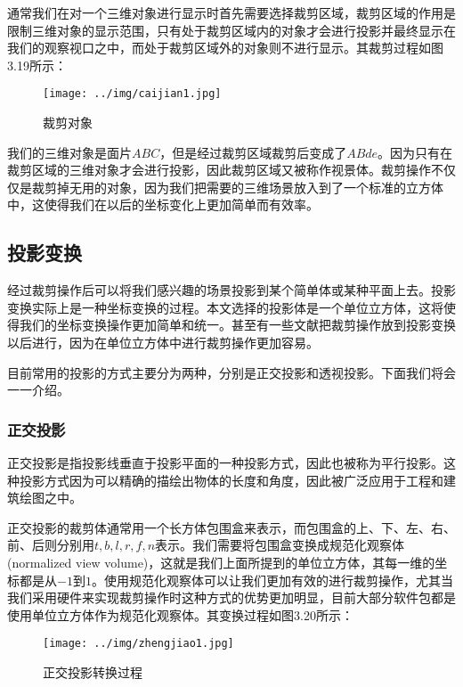 通常我们在对一个三维对象进行显示时首先需要选择裁剪区域，裁剪区域的作用是限制三维对象的显示范围，只有处于裁剪区域内的对象才会进行投影并最终显示在我们的观察视口之中，而处于裁剪区域外的对象则不进行显示。其裁剪过程如图3.19所示：

\begin{figure}[htb]
\centering
\texttt{[image: ../img/caijian1.jpg]}
\caption{裁剪对象}
\label{fig：graph}
\end{figure} 

我们的三维对象是面片$ABC$，但是经过裁剪区域裁剪后变成了$ABde$。因为只有在裁剪区域的三维对象才会进行投影，因此裁剪区域又被称作视景体。裁剪操作不仅仅是裁剪掉无用的对象，因为我们把需要的三维场景放入到了一个标准的立方体中，这使得我们在以后的坐标变化上更加简单而有效率。

\subsection{投影变换}
经过裁剪操作后可以将我们感兴趣的场景投影到某个简单体或某种平面上去。投影变换实际上是一种坐标变换的过程。本文选择的投影体是一个单位立方体，这将使得我们的坐标变换操作更加简单和统一。甚至有一些文献把裁剪操作放到投影变换以后进行，因为在单位立方体中进行裁剪操作更加容易。

目前常用的投影的方式主要分为两种，分别是正交投影和透视投影。下面我们将会一一介绍。

\subsubsection{正交投影}
正交投影是指投影线垂直于投影平面的一种投影方式，因此也被称为平行投影。这种投影方式因为可以精确的描绘出物体的长度和角度，因此被广泛应用于工程和建筑绘图之中。

正交投影的裁剪体通常用一个长方体包围盒来表示，而包围盒的上、下、左、右、前、后则分别用$t,b,l,r,f,n$表示。我们需要将包围盒变换成规范化观察体(normalized
view volume)，这就是我们上面所提到的单位立方体，其每一维的坐标都是从$-1$到$1$。使用规范化观察体可以让我们更加有效的进行裁剪操作，尤其当我们采用硬件来实现裁剪操作时这种方式的优势更加明显，目前大部分软件包都是使用单位立方体作为规范化观察体。其变换过程如图3.20所示\cite{Tomas02}：

\begin{figure}[htb]
\centering
\texttt{[image: ../img/zhengjiao1.jpg]}
\caption{正交投影转换过程}
\label{fig：graph}
\end{figure} 

